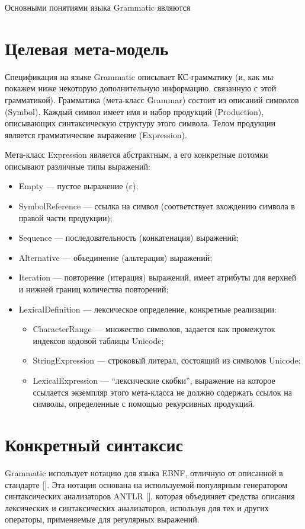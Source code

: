 Основными понятиями языка Grammatic являются 

\section{Целевая мета-модель}

Спецификация на языке Grammatic описывает КС-грамматику (и, как мы покажем ниже некоторую дополнительную информацию, связанную с этой грамматикой). Грамматика (мета-класс Grammar) состоит из описаний символов (Symbol). Каждый символ имеет имя и набор продукций (Production), описывающих синтаксическую структуру этого символа. Телом продукции является грамматическое выражение (Expression).

Мета-класс Expression является абстрактным, а его конкретные потомки описывают различные типы выражений:
\begin{itemize}
\item Empty --- пустое выражение ($\varepsilon$);
\item SymbolReference --- ссылка на символ (соответствует вхождению символа в правой части продукции);
\item Sequence --- последовательность (конкатенация) выражений;
\item Alternative --- объединение (альтерация) выражений;
\item Iteration --- повторение (итерация) выражений, имеет атрибуты для верхней и нижней границ количества повторений;
\item LexicalDefinition --- лексическое определение, конкретные реализации:
	\begin{itemize}
		\item CharacterRange --- множество символов, задается как промежуток индексов кодовой таблицы Unicode;
		\item StringExpression --- строковый литерал, состоящий из символов Unicode;
		\item LexicalExpression --- ``лексические скобки'', выражение на которое ссылается экземпляр этого мета-класса не должно содержать ссылок на символы, определенные с помощью рекурсивных продукций.
	\end{itemize}
\end{itemize}


\section{Конкретный синтаксис}

Grammatic использует нотацию для языка EBNF, отличную от описанной в стандарте []. Эта нотация основана на используемой популярным генератором синтаксических анализаторов ANTLR [], которая объединяет средства описания лексических и синтаксических анализаторов, используя для тех и других операторы, применяемые для регулярных выражений.

